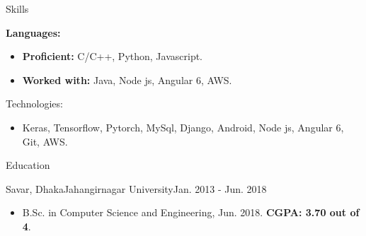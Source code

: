 \documentclass[]{mcdowellcv}
\def\first{8pt}
\begin{document}
	\makeheader
	\begin{cvsection}{Skills}
	 
		\begin{cvsubsection}{}{}{}
		    \begin{description}
		     \vspace*{\first}
		     \hspace*{-8pt}\textbf{Languages:}
		    \end{description}
			\begin{itemize}
				\item \textbf{Proficient:} C/C++, Python, Javascript.
				\item \textbf{Worked with:}  Java, Node js,  Angular 6, AWS.
			\end{itemize}
		\end{cvsubsection}
		\begin{cvsubsection}{\hspace*{\first}Technologies:}{}{}
			\begin{itemize}
			  \item Keras, Tensorflow,  Pytorch, MySql, Django, Android, Node js, Angular 6, Git, AWS. 
			\end{itemize}
		\end{cvsubsection}
	\end{cvsection}
		\begin{cvsection}{Education}
		\begin{cvsubsection}{\hspace*{\first}Savar, Dhaka}{Jahangirnagar University}{Jan. 2013 - Jun. 2018}
		    \vspace{2pt}			
			\begin{itemize}
			    \item B.Sc. in Computer Science and Engineering, Jun. 2018. \textbf{CGPA: 3.70 out of 4}.	
			\end{itemize}
		\end{cvsubsection}
	\end{cvsection}
\end{document}
